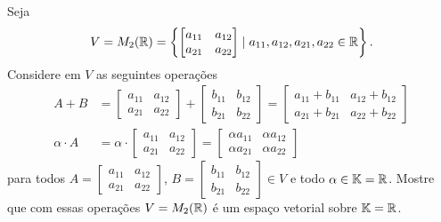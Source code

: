 \documentclass[12pt]{exam}
\begin{document}
    \questao{} Seja
    \[
        V = M_2(\mathbb{R}) = \left\{\begin{bmatrix}a_{11} & a_{12}\\a_{21} & a_{22} \end{bmatrix} \mid a_{11}, a_{12}, a_{21}, a_{22} \in \mathbb{R}\right\}.
    \]
    Considere em $V$ as seguintes operações
    \begin{align*}
        A + B &= \begin{bmatrix}a_{11} & a_{12}\\a_{21} & a_{22} \end{bmatrix} + \begin{bmatrix}b_{11} & b_{12}\\b_{21} & b_{22} \end{bmatrix} = \begin{bmatrix}a_{11} + b_{11 }& a_{12} + b_{12}\\a_{21} + b_{21} & a_{22} + b_{22}\end{bmatrix}\\
        \alpha \cdot A &= \alpha \cdot \begin{bmatrix}a_{11} & a_{12}\\a_{21} & a_{22} \end{bmatrix} = \begin{bmatrix}\alpha a_{11} & \alpha a_{12}\\\alpha a_{21} & \alpha a_{22} \end{bmatrix}
    \end{align*}
    para todos $A = \begin{bmatrix}a_{11} & a_{12}\\a_{21} & a_{22} \end{bmatrix}$, $B = \begin{bmatrix}b_{11} & b_{12}\\b_{21} & b_{22} \end{bmatrix} \in V$ e todo $\alpha \in \mathbb{K} = \mathbb{R}$.
    Mostre que com essas operações $V = M_2(\mathbb{R})$ é um espaço vetorial sobre $\mathbb{K} = \mathbb{R}$.

    \solucao
\end{document}
